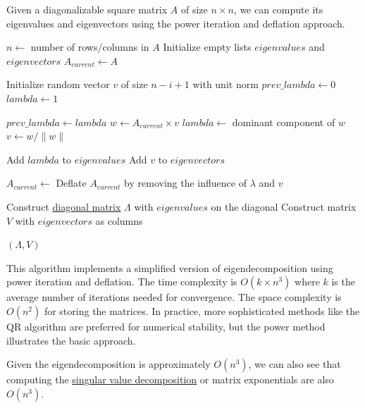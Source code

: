   \begin{algo}[Eigendecomposition]
    Given a diagonalizable square matrix $A$ of size $n \times n$, we can compute its eigenvalues and eigenvectors using the power iteration and deflation approach.
    \begin{algorithmic}[1]
       
        \State $n \gets$ number of rows/columns in $A$
        \State Initialize empty lists $eigenvalues$ and $eigenvectors$
        \State $A_{current} \gets A$ 
        
          \State Initialize random vector $v$ of size $n-i+1$ with unit norm
          \State $prev\_lambda \gets 0$
          \State $lambda \gets 1$
          
           
            \State $prev\_lambda \gets lambda$
            \State $w \gets A_{current} \times v$ 
            \State $lambda \gets$ dominant component of $w$
            \State $v \gets w / \|w\|$ 
          \EndWhile
          
          \State Add $lambda$ to $eigenvalues$
          \State Add $v$ to $eigenvectors$
          
          \State $A_{current} \gets$ Deflate $A_{current}$ by removing the influence of $\lambda$ and $v$
        \EndFor
        
        \State Construct \hyperref[lin-def:diagonal-matrix]{diagonal matrix} $\Lambda$ with $eigenvalues$ on the diagonal
        \State Construct matrix $V$ with $eigenvectors$ as columns
        
        \State \Return $(\Lambda, V)$ 
      \EndProcedure
    \end{algorithmic}
    This algorithm implements a simplified version of eigendecomposition using power iteration and deflation. The time complexity is $O(k \times n^3)$ where $k$ is the average number of iterations needed for convergence. The space complexity is $O(n^2)$ for storing the matrices. In practice, more sophisticated methods like the QR algorithm are preferred for numerical stability, but the power method illustrates the basic approach.
  \end{algo}

  Given the eigendecomposition is approximately $O(n^3)$, we can also see that computing the \hyperref[lin-thm:singular-value-decomposition]{singular value decomposition} or matrix exponentials are also $O(n^3)$. 
